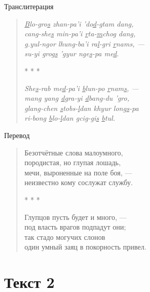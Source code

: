 \begin{center}Транслитерация\end{center}

\begin{verse}
	\emph{\ul{B}lo-gro\ul{s} zhan-pa'i 'do\ul{d}-gtam dang,}\\
	\emph{cang-she\ul{s} min-pa'i \ul{r}ta-\ul{m}chog dang,}\\
	\emph{\ul{g}.yul-ngor lhung-ba'i ra\ul{l}-gri \ul{r}nams, ---}\\
	\emph{su-yi grog\ul{s} 'gyur nge\ul{s}-pa me\ul{d}.}

	* * *
	
	\emph{She\ul{s}-rab me\ul{d}-pa'i \ul{b}lun-po \ul{r}nam\ul{s}, ---}\\
	\emph{mang yang \ul{d}gra-yi \ul{d}bang-du 'gro,}\\
	\emph{\ul{g}lang-chen \ul{s}tob{s}-\ul{l}dan khyur long\ul{s}-pa}\\
	\emph{ri-bong \ul{b}lo-\ul{l}dan \ul{g}cig-gi\ul{s} \ul{b}tul.}
\end{verse}

\begin{center}Перевод\end{center}

\begin{verse}
	Безотчётные слова малоумного,\\
	породистая, но глупая лошадь,\\
	мечи, выроненные на поле боя, ---\\
	неизвестно кому сослужат службу.
	
	* * *

	Глупцов пусть будет и много, ---\\
	под власть врагов подпадут они;\\
	так стадо могучих слонов\\
	один умный заяц в покорность привел.
\end{verse}

\pagebreak

\section{Текст 2}


